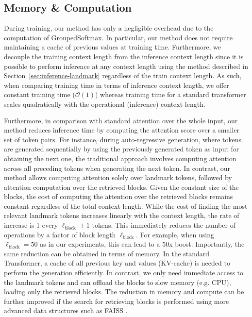 \subsection{Memory \& Computation}

During training, our method has only a negligible overhead due to the computation of GroupedSoftmax. In particular, our method does not require maintaining a cache of previous values at training time. Furthermore, we decouple the training context length from the inference context length since it is possible to perform inference at any context length using the method described in Section~\ref{sec:inference-landmark} regardless of the train context length. As such, when comparing training time in terms of inference context length, we offer constant training time ($\mathcal{O}(1)$) whereas training time for a standard transformer scales quadratically with the operational (inference) context length.

Furthermore, in comparison with standard attention over the whole input, our method reduces inference time by computing the attention score over a smaller set of token pairs. For instance, during auto-regressive generation, where tokens are generated sequentially by using the previously generated token as input for obtaining the next one, the traditional approach involves computing attention across all preceding tokens when generating the next token. In contrast, our method allows computing attention solely over landmark tokens, followed by attention computation over the retrieved blocks. Given the constant size of the blocks, the cost of computing the attention over the retrieved blocks remains constant regardless of the total context length. While the cost of finding the most relevant landmark tokens increases linearly with the context length, the rate of increase is 1 every $\ell_{\text{block}} + 1$ tokens. This immediately reduces the number of operations by a factor of block length $\ell_{\text{block}}$. For example, when using $\ell_{\text{block}} = 50$ as in our experiments, this can lead to a 50x boost. Importantly, the same reduction can be obtained in terms of memory. In the standard Transformer, a cache of all previous key and values (KV-cache) is needed to perform the generation efficiently. In contrast, we only need immediate access to the landmark tokens and can offload the blocks to slow memory (e.g. CPU), loading only the retrieved blocks. The reduction in memory and compute can be further improved if the search for retrieving blocks is performed using more advanced data structures such as FAISS \cite{johnson_billion-scale_2017}.

